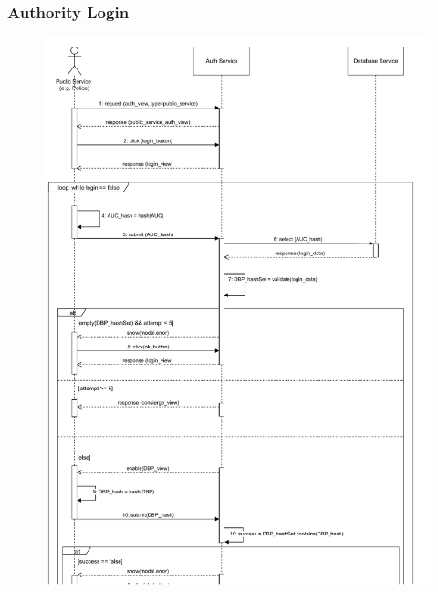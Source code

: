 \documentclass[12pt,a4paper]{article}
\begin{document}
\subsubsection{Authority Login}
\begin{figure}[H]
				\centering
				\includegraphics[width=1\textwidth,height=0.9\textheight,keepaspectratio]{assets/sequence_diagrams/exports/login_public_subject.pdf}
				\label{fig:loginAuth_sequence}
			\end{figure}
\end{document}
